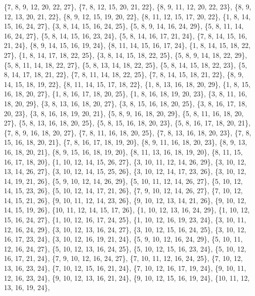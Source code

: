 \documentclass[11pt,a4paper]{article}
\begin{document}
{\{7, 8, 9, 12, 20, 22, 27\}, \{7, 8, 12, 15, 20, 21, 22\}, \{8, 9, 11, 12, 20, 22, 23\}, \{8, 9, 12, 13, 20, 21, 22\}, \{8, 9, 12, 15, 19, 20, 22\},
\{8, 11, 12, 15, 17, 20, 22\}, \{1, 8, 14, 15, 16, 24, 27\}, \{3, 8, 14, 15, 16, 24, 25\}, \{5, 8, 9, 14, 16, 24, 29\}, \{5, 8, 11, 14, 16, 24, 27\},
\{5, 8, 14, 15, 16, 23, 24\}, \{5, 8, 14, 16, 17, 21, 24\}, \{7, 8, 14, 15, 16, 21, 24\}, \{8, 9, 14, 15, 16, 19, 24\}, \{8, 11, 14, 15, 16, 17, 24\},
\{1, 8, 14, 15, 18, 22, 27\}, \{1, 8, 14, 17, 18, 22, 25\}, \{3, 8, 14, 15, 18, 22, 25\}, \{5, 8, 9, 14, 18, 22, 29\}, \{5, 8, 11, 14, 18, 22, 27\},
\{5, 8, 13, 14, 18, 22, 25\}, \{5, 8, 14, 15, 18, 22, 23\}, \{5, 8, 14, 17, 18, 21, 22\}, \{7, 8, 11, 14, 18, 22, 25\}, \{7, 8, 14, 15, 18, 21, 22\},
\{8, 9, 14, 15, 18, 19, 22\}, \{8, 11, 14, 15, 17, 18, 22\}, \{1, 8, 13, 16, 18, 20, 29\}, \{1, 8, 15, 16, 18, 20, 27\}, \{1, 8, 16, 17, 18, 20, 25\},
\{1, 8, 16, 18, 19, 20, 23\}, \{3, 8, 11, 16, 18, 20, 29\}, \{3, 8, 13, 16, 18, 20, 27\}, \{3, 8, 15, 16, 18, 20, 25\}, \{3, 8, 16, 17, 18, 20, 23\},
\{3, 8, 16, 18, 19, 20, 21\}, \{5, 8, 9, 16, 18, 20, 29\}, \{5, 8, 11, 16, 18, 20, 27\}, \{5, 8, 13, 16, 18, 20, 25\}, \{5, 8, 15, 16, 18, 20, 23\},
\{5, 8, 16, 17, 18, 20, 21\}, \{7, 8, 9, 16, 18, 20, 27\}, \{7, 8, 11, 16, 18, 20, 25\}, \{7, 8, 13, 16, 18, 20, 23\}, \{7, 8, 15, 16, 18, 20, 21\},
\{7, 8, 16, 17, 18, 19, 20\}, \{8, 9, 11, 16, 18, 20, 23\}, \{8, 9, 13, 16, 18, 20, 21\}, \{8, 9, 15, 16, 18, 19, 20\}, \{8, 11, 13, 16, 18, 19, 20\},
\{8, 11, 15, 16, 17, 18, 20\}, \{1, 10, 12, 14, 15, 26, 27\}, \{3, 10, 11, 12, 14, 26, 29\}, \{3, 10, 12, 13, 14, 26, 27\}, \{3, 10, 12, 14, 15, 25, 26\},
\{3, 10, 12, 14, 17, 23, 26\}, \{3, 10, 12, 14, 19, 21, 26\}, \{5, 9, 10, 12, 14, 26, 29\}, \{5, 10, 11, 12, 14, 26, 27\}, \{5, 10, 12, 14, 15, 23, 26\},
\{5, 10, 12, 14, 17, 21, 26\}, \{7, 9, 10, 12, 14, 26, 27\}, \{7, 10, 12, 14, 15, 21, 26\}, \{9, 10, 11, 12, 14, 23, 26\}, \{9, 10, 12, 13, 14, 21, 26\},
\{9, 10, 12, 14, 15, 19, 26\}, \{10, 11, 12, 14, 15, 17, 26\}, \{1, 10, 12, 13, 16, 24, 29\}, \{1, 10, 12, 15, 16, 24, 27\}, \{1, 10, 12, 16, 17, 24, 25\},
\{1, 10, 12, 16, 19, 23, 24\}, \{3, 10, 11, 12, 16, 24, 29\}, \{3, 10, 12, 13, 16, 24, 27\}, \{3, 10, 12, 15, 16, 24, 25\}, \{3, 10, 12, 16, 17, 23, 24\},
\{3, 10, 12, 16, 19, 21, 24\}, \{5, 9, 10, 12, 16, 24, 29\}, \{5, 10, 11, 12, 16, 24, 27\}, \{5, 10, 12, 13, 16, 24, 25\}, \{5, 10, 12, 15, 16, 23, 24\},
\{5, 10, 12, 16, 17, 21, 24\}, \{7, 9, 10, 12, 16, 24, 27\}, \{7, 10, 11, 12, 16, 24, 25\}, \{7, 10, 12, 13, 16, 23, 24\}, \{7, 10, 12, 15, 16, 21, 24\},
\{7, 10, 12, 16, 17, 19, 24\}, \{9, 10, 11, 12, 16, 23, 24\}, \{9, 10, 12, 13, 16, 21, 24\}, \{9, 10, 12, 15, 16, 19, 24\}, \{10, 11, 12, 13, 16, 19, 24\},
}
\end{document}

